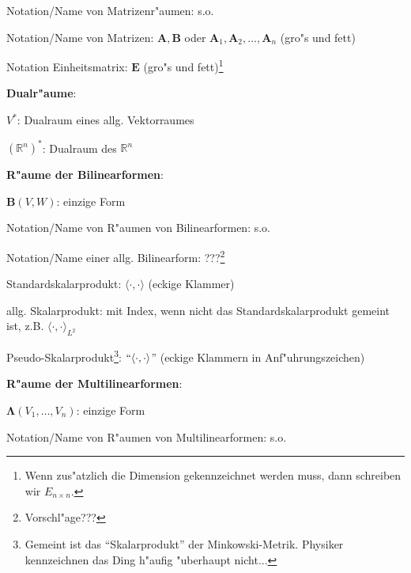 \begin{list_sabina}
\begin{sub_list_sabina}
        Notation/Name von Matrizenr"aumen: s.o.
        \item
        Notation/Name von Matrizen: $\mathbf{A}, \mathbf{B}$ oder 
        $\mathbf{A}_{1},\mathbf{A}_{2},...,\mathbf{A}_{n}$ (gro"s und fett)
        \item
        Notation Einheitsmatrix: $\mathbf{E}$ (gro"s und fett)\footnote{Wenn zus"atzlich die Dimension
          gekennzeichnet werden muss, dann schreiben wir $E_{n\times n}$.}
        \end{sub_list_sabina}
\item
\textbf{Dualr"aume}:
        \begin{sub_list_sabina}
        \item
        $V^{\ast}$: Dualraum eines allg. Vektorraumes
        \item
        $(\mathbb{R}^n)^{\ast}$: Dualraum des $\mathbb{R}^n$
        \end{sub_list_sabina}
\item
\textbf{R"aume der Bilinearformen}:
        \begin{sub_list_sabina}
        \item
        $\mathbf{B}(V,W)$: einzige Form
        \item
        Notation/Name von R"aumen von Bilinearformen: s.o.
        \item
        Notation/Name einer allg. Bilinearform: ???\footnote{Vorschl"age???}%
        \item
        Standardskalarprodukt: $\langle \cdot, \cdot \rangle$ (eckige Klammer)
        \item
        allg. Skalarprodukt: mit Index, wenn nicht das Standardskalarprodukt gemeint ist, z.B.
        $\langle \cdot, \cdot \rangle_{L^2}$
        \item
        Pseudo-Skalarprodukt\footnote{Gemeint ist das ``Skalarprodukt'' 
        der Minkowski-Metrik. Physiker kennzeichnen das Ding h"aufig 
        "uberhaupt nicht...}:  $``\langle \cdot, \cdot \rangle$'' 
        (eckige Klammern in Anf"uhrungszeichen)
        \end{sub_list_sabina}
\item
\textbf{R"aume der Multilinearformen}:
        \begin{sub_list_sabina}
        \item
        $\mathbf{\Lambda}{(V_{1}, \dots, V_{n})}$: einzige Form
        \item
        Notation/Name von R"aumen von Multilinearformen: s.o.

\end{sub_list_sabina}
\end{list_sabina}

